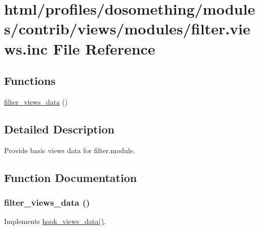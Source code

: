 \hypertarget{filter_8views_8inc}{
\section{html/profiles/dosomething/modules/contrib/views/modules/filter.views.inc File Reference}
\label{filter_8views_8inc}
}
\subsection*{Functions}
\begin{DoxyCompactItemize}
\item 
\hyperlink{filter_8views_8inc_a7cff84d71c43da31b5941bcc92d7bdac}{filter\_\-views\_\-data} ()
\end{DoxyCompactItemize}


\subsection{Detailed Description}
Provide basic views data for filter.module. 

\subsection{Function Documentation}
\hypertarget{filter_8views_8inc_a7cff84d71c43da31b5941bcc92d7bdac}{
\subsubsection[{filter\_\-views\_\-data}]{\setlength{\rightskip}{0pt plus 5cm}filter\_\-views\_\-data ()}}
\label{filter_8views_8inc_a7cff84d71c43da31b5941bcc92d7bdac}
Implements \hyperlink{group__views__hooks_ga227057901681e4a33e33c199c7a8c989}{hook\_\-views\_\-data()}. 
